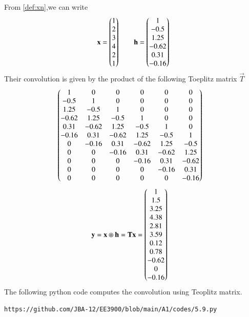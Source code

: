 \documentclass[journal,12pt,twocolumn]{IEEEtran}
\renewcommand\thesection{\arabic{section}}
\begin{document}
\begin{enumerate}[label=\thesection.\arabic*]
\solution From \eqref{def:xn},we can write
\begin{align}
\textbf{x} = \begin{pmatrix}1 \\ 2 \\ 3 \\ 4 \\ 2 \\ 1\end{pmatrix} \qquad
\textbf{h} = \begin{pmatrix}1 \\ -0.5 \\ 1.25 \\ -0.62 \\ 0.31 \\ -0.16\end{pmatrix}
\end{align}
Their convolution is given by the product of the following Toeplitz matrix $\vec{T}$
\begin{align}
		&\begin{pmatrix}
			1 & 0 & 0 & 0 & 0 & 0 \\
			-0.5 & 1 & 0 & 0 & 0 & 0 \\
			1.25 & -0.5 & 1 & 0 & 0 & 0 \\
			-0.62 & 1.25 & -0.5 & 1 & 0 & 0 \\
			0.31 & -0.62 & 1.25 & -0.5 & 1 & 0 \\
			-0.16 & 0.31 & -0.62 & 1.25 & -0.5 & 1 \\
			0 & -0.16 & 0.31 & -0.62 & 1.25 & -0.5 \\
			0 & 0 & -0.16 & 0.31 & -0.62 & 1.25 \\
			0 & 0 & 0 & -0.16 & 0.31 & -0.62 \\
			0 & 0 & 0 & 0 & -0.16 & 0.31 \\
			0 & 0 & 0 & 0 & 0 & -0.16 \\
		\end{pmatrix} 
\end{align}
\begin{align}
&\textbf{y} = \textbf{x} \circledast \textbf{h} = \textbf{Tx} = \begin{pmatrix}1 \\ 1.5 \\ 3.25 \\ 4.38 \\ 2.81 \\ 3.59 \\ 0.12 \\ 0.78 \\ -0.62 \\ 0 \\ -0.16\end{pmatrix}
\end{align}
The following python code computes the convolution using Teoplitz matrix.
\begin{lstlisting}
https://github.com/JBA-12/EE3900/blob/main/A1/codes/5.9.py
\end{lstlisting}

\end{enumerate}
\end{document}

